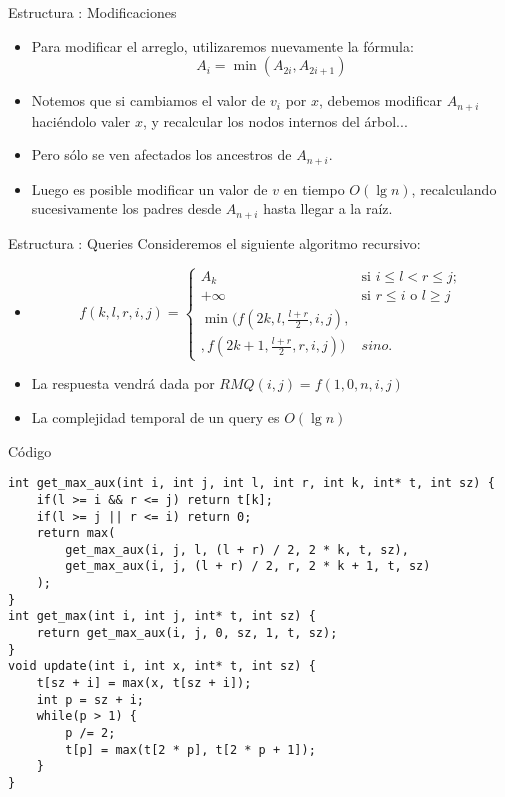 \documentclass{beamer}
\DeclareMathOperator*{\mimin}{min}
\begin{document}
\begin{frame}{Estructura : Modificaciones}
    \begin{itemize}
       \item Para modificar el arreglo, utilizaremos nuevamente la fórmula:
       $$A_i = \mimin(A_{2i},A_{2i+1})$$
       \item Notemos que si cambiamos el valor de $v_i$ por $x$, debemos modificar $A_{n+i}$ haciéndolo valer $x$, y recalcular
          los nodos internos del árbol...
       \item Pero sólo se ven afectados los ancestros de $A_{n+i}$.
       \item Luego es posible modificar un valor de $v$ en tiempo $O(\lg n)$, recalculando sucesivamente los padres desde $A_{n+i}$ hasta llegar a la raíz.
    \end{itemize}
\end{frame}


\begin{frame}{Estructura : Queries}
     Consideremos el siguiente algoritmo recursivo:
    \begin{itemize}
         \item $$f(k,l, r, i,j) = \left\{ \begin{array}{ll}
                                     A_k & \mbox{si $i \leq l < r \leq j$};\\
                                     +\infty &
                                      \mbox{si $r \leq i$ o $l \geq j$} \\
                                     \mimin(f(2k,l,\frac{l+r}{2},i,j), & \\
                                     ,f(2k+1,\frac{l+r}{2},r,i,j))& sino.\end{array} \right.$$
         \item La respuesta vendrá dada por $RMQ(i,j) = f(1,0,n,i,j)$
         \item La complejidad temporal de un query es $O(\lg n)$
    \end{itemize}
\end{frame}
\begin{frame}[fragile]{Código}
\begin{lstlisting}
int get_max_aux(int i, int j, int l, int r, int k, int* t, int sz) {
    if(l >= i && r <= j) return t[k];
    if(l >= j || r <= i) return 0;
    return max(
        get_max_aux(i, j, l, (l + r) / 2, 2 * k, t, sz),
        get_max_aux(i, j, (l + r) / 2, r, 2 * k + 1, t, sz)
    );
}
int get_max(int i, int j, int* t, int sz) {
    return get_max_aux(i, j, 0, sz, 1, t, sz);
}
void update(int i, int x, int* t, int sz) {
    t[sz + i] = max(x, t[sz + i]);
    int p = sz + i;
    while(p > 1) {
        p /= 2;
        t[p] = max(t[2 * p], t[2 * p + 1]);
    }
}
\end{lstlisting}
\end{frame}
\end{document}

